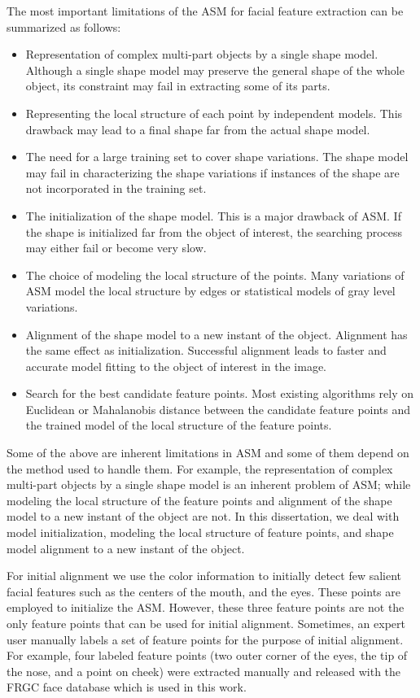 The most important limitations of the ASM for facial feature
extraction can be summarized as follows:
\begin{itemize}
    \item  Representation of complex multi-part objects by a single shape model.
    Although a single shape model may preserve the general shape of the
    whole object, its constraint may fail in extracting some of its parts.
    \item Representing the local structure of each point by independent
    models. This drawback may lead to a final shape far from the actual shape model.
    \item The need for a large training set to cover shape variations. The shape model
    may fail in characterizing the shape variations if instances of the shape
    are not incorporated in the training set.
    \item The initialization of the shape model. This is a major drawback of ASM.
    If the shape is initialized far from the object of interest,
    the searching process may either fail or become very slow.
    \item The choice of modeling the local structure of the
    points. Many variations of ASM model the local structure by
    edges or statistical models of gray level variations.
    \item Alignment of the shape model to a new instant of the
    object. Alignment has the same effect as initialization.  Successful alignment
    leads to faster and accurate model fitting to the object of interest in the image.
    \item Search for the best candidate feature points. Most
    existing algorithms rely on Euclidean or Mahalanobis distance between the candidate feature points and
    the trained model of the local structure of the feature points.
\end{itemize}

Some of the above are inherent limitations in ASM and some of them
depend on the method used to handle them. For example, the
representation of complex multi-part objects by a single shape model
is an inherent problem of ASM; while modeling the local structure of
the feature points and alignment of the shape model to a new instant
of the object are not. In this dissertation, we deal with model
initialization, modeling the local structure of feature points, and
shape model alignment to a new instant of the object.

For initial alignment we use the color information to initially
detect few salient facial features such as the centers of the mouth,
and the eyes. These points are employed to initialize the ASM.
However, these three feature points are not the only feature points
that can be used for initial alignment. Sometimes, an expert user
manually labels a set of feature points for the purpose of initial
alignment. For example, four labeled feature points (two outer
corner of the eyes, the tip of the nose, and a point on cheek) were
extracted manually and released with the FRGC face database which is
used in this work.

